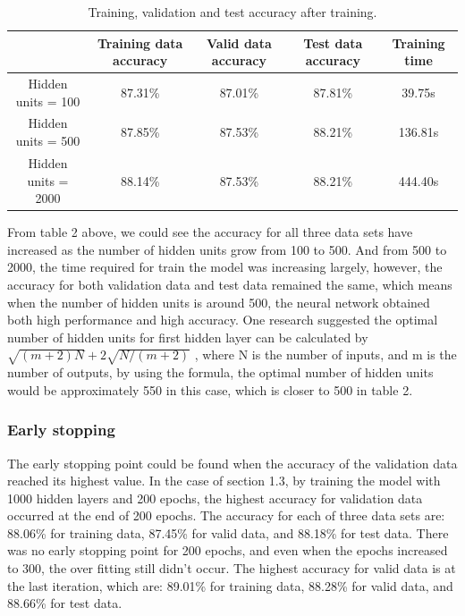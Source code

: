 \documentclass[10pt,letterpaper]{article}
\begin{document}
\begin{table}[H]
\centering
{\small

\begin{tabular}{ccccc}
\hline
 & Training data accuracy  & Valid data accuracy      & Test data accuracy & Training time \\ \hline
Hidden units = 100 & 87.31\% & 87.01\% & 87.81\% & 39.75s\\ 
Hidden units = 500 & 87.85\% & 87.53\% & 88.21\% & 136.81s\\ 
Hidden units = 2000 & 88.14\% & 87.53\% & 88.21\% & 444.40s\\ \hline
\end{tabular}
}

\vspace{-0.2cm}
\caption{Training, validation and test accuracy after training.}
\label{tab:Number of hidden units}
\vspace{-0.4cm}
\end{table}

From table 2 above, we could see the accuracy for all three data sets have increased as the number of hidden units grow from 100 to 500. And from 500 to 2000, the time required for train the model was increasing largely, however, the accuracy for both validation data and test data remained the same, which means when the number of hidden units is around 500, the neural network obtained both high performance and high accuracy. One research suggested\cite{1189626} the optimal number of hidden units for first hidden layer can be calculated by $\sqrt{(m+2)N}+2\sqrt{N/(m+2)}$ , where N is the number of inputs, and m is the number of outputs, by using the formula, the optimal number of hidden units would be approximately 550 in this case, which is closer to 500 in table 2. 

\subsubsection{Early stopping}

The early stopping point could be found when the accuracy of the validation data reached its highest value\cite{Prechelt97earlystopping}. In the case of section 1.3, by training the model with 1000 hidden layers and 200 epochs, the highest accuracy for validation data occurred at the end of 200 epochs. The accuracy for each of three data sets are: 88.06\% for training data, 87.45\% for valid data, and 88.18\% for test data. There was no early stopping point for 200 epochs, and even when the epochs increased to 300, the over fitting still didn't occur. The highest accuracy for valid data is at the last iteration, which are: 89.01\% for training data, 88.28\% for valid data, and 88.66\% for test data. 
\end{document}
